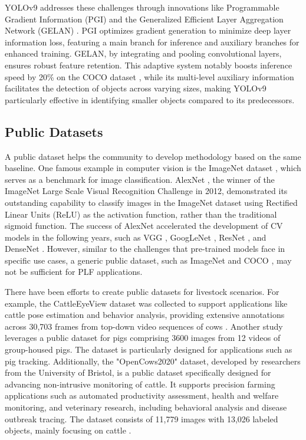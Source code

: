 YOLOv9 addresses these challenges through innovations like Programmable Gradient Information (PGI) and the Generalized Efficient Layer Aggregation Network (GELAN) \cite{wang2024yolov9}. PGI optimizes gradient generation to minimize deep layer information loss, featuring a main branch for inference and auxiliary branches for enhanced training. GELAN, by integrating and pooling convolutional layers, ensures robust feature retention. This adaptive system notably boosts inference speed by 20\% \cite{wang2024yolov9} on the COCO dataset \cite{lin2014microsoft}, while its multi-level auxiliary information facilitates the detection of objects across varying sizes, making YOLOv9 particularly effective in identifying smaller objects compared to its predecessors.

\subsection{Public Datasets}
A public dataset helps the community to develop methodology based on the same baseline. One famous example in computer vision is the ImageNet dataset \cite{deng2009imagenet}, which serves as a benchmark for image classification. AlexNet \cite{krizhevsky2017imagenet}, the winner of the ImageNet Large Scale Visual Recognition Challenge in 2012, demonstrated its outstanding capability to classify images in the ImageNet dataset using Rectified Linear Units (ReLU) as the activation function, rather than the traditional sigmoid function. The success of AlexNet accelerated the development of CV models in the following years, such as VGG \cite{karen2014very}, GoogLeNet \cite{szegedy2015going}, ResNet \cite{targ2016resnet}, and DenseNet \cite{huang2017densely}. However, similar to the challenges that pre-trained models face in specific use cases, a generic public dataset, such as ImageNet \cite{deng2009imagenet} and COCO \cite{lin2014microsoft}, may not be sufficient for PLF applications. 

There have been efforts to create public datasets for livestock scenarios. For example, the CattleEyeView dataset was collected to support applications like cattle pose estimation and behavior analysis, providing extensive annotations across 30,703 frames from top-down video sequences of cows \cite{ong2023cattleeyeview}. Another study \cite{t2020long} leverages a public dataset for pigs comprising 3600 images from 12 videos of group-housed pigs. The dataset is particularly designed for applications such as pig tracking. Additionally, the "OpenCows2020" dataset, developed by researchers from the University of Bristol, is a public dataset specifically designed for advancing non-intrusive monitoring of cattle. It supports precision farming applications such as automated productivity assessment, health and welfare monitoring, and veterinary research, including behavioral analysis and disease outbreak tracing. The dataset consists of 11,779 images with 13,026 labeled objects, mainly focusing on cattle \cite{visualization-tools-for-opencows2020-dataset}. 

